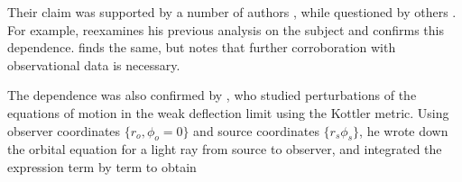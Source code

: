 Their claim was supported by a number of authors \citep{lake2007,Sereno2008,Schucker2008a,Schucker2009}, while questioned by others \citep{Simpson2008,Park2008,Khriplovich2008}. For example, \citet{lake2007} reexamines his previous analysis on the subject \citep{Lake2002} and confirms this dependence. \citet{Schucker2009} finds the same, but notes that further corroboration with observational data is necessary. 


The dependence was also confirmed by \citet{Sereno2008}, who studied perturbations of the equations of motion in the weak deflection limit using the Kottler metric. Using observer coordinates $\{ r_o, \phi_o = 0 \}$ and source coordinates $\{ r_s \phi_s \}$, he wrote down the orbital equation for a light ray from source to observer, and integrated the expression term by term to obtain





